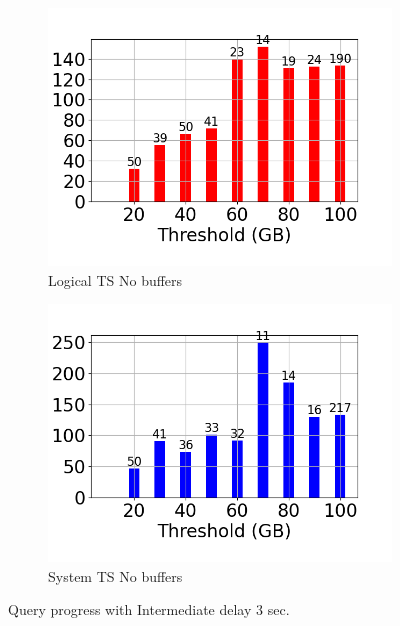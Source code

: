 \begin{figure}
\begin{subfigure}[c]{0.4\textwidth}
	\end{subfigure}
	\begin{subfigure}[c]{0.4\textwidth}
		\includegraphics[width=1\textwidth]   {figures/Experiments/Dynamic/Progress/3/average_query_time_per_batch_version_999777016_10485760_10_delay[3].png}
		\caption{Logical TS No buffers}
		\label{fig:progress-queries-3-logical-no-buffers}
	\end{subfigure}
	\begin{subfigure}[c]{0.4\textwidth}
		\includegraphics[width=1\textwidth]   {figures/Experiments/Dynamic/Progress/3/average_query_time_per_batch_version_999777017_10485760_10_delay[3].png}
		\caption{System TS No buffers}
		\label{fig:progress-queries-3-system-no-buffers}
	\end{subfigure}
	\caption{Query progress with Intermediate delay 3 sec.}
	\label{fig:query-progress-delay-3}
\end{figure}


